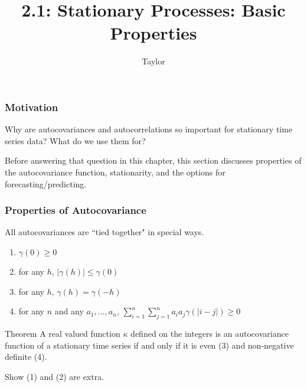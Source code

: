 \documentclass{beamer}
\title["2.1"]{2.1: Stationary Processes: Basic Properties}
\author{Taylor}
\institute[UVA] 
{
University of Virginia \\
\medskip
\textit{} 
}
\date{}
\begin{document}

\begin{frame}
\titlepage 
\end{frame}

\begin{frame}
\frametitle{Motivation}

Why are autocovariances and autocorrelations so important for stationary time series data? What do we use them for?
\newline

Before answering that question in this chapter, this section discusses properties of the autocovariance function, stationarity, and the options for forecasting/predicting.



\end{frame}




\begin{frame}
\frametitle{Properties of Autocovariance}

All autocovariances are ``tied together" in special ways.
\newline

\begin{enumerate}
\item $\gamma(0) \ge 0$ 
\item for any $h$, $|\gamma(h)| \le \gamma(0)$
\item for any $h$, $\gamma(h) = \gamma(-h)$
\item for any $n$ and any $a_1, \ldots, a_n$, $\sum_{i=1}^n\sum_{j=1}^n a_i a_j \gamma(|i-j|) \ge 0$
\end{enumerate}

\begin{block}{Theorem}
A real valued function $\kappa$ defined on the integers is an autocovariance function of a stationary time series if and only if it is even (3) and non-negative definite (4).
\end{block}

Show (1) and (2) are extra.
\end{frame}

\end{document}
